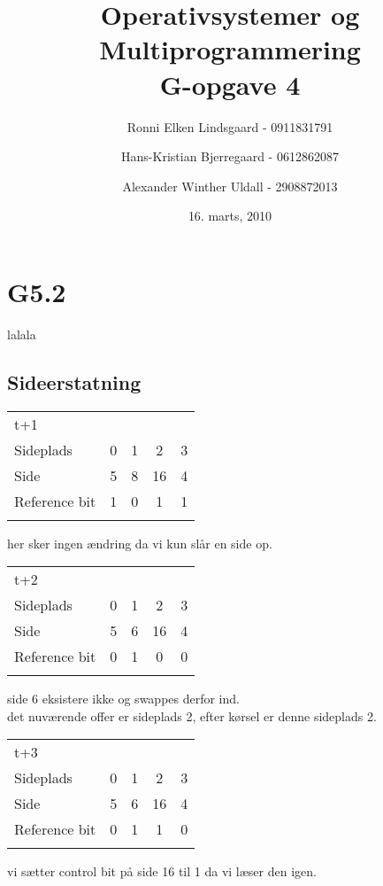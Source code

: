 \documentclass[titlepage]{article}
\title{Operativsystemer og Multiprogrammering\\G-opgave 4}
\author{Ronni Elken Lindsgaard - 0911831791 \and
Hans-Kristian Bjerregaard - 0612862087 \and
Alexander Winther Uldall - 2908872013}
\date{16. marts, 2010}
\begin{document}
\maketitle
\newpage

\section{G5.2}
lalala

 \subsection{Sideerstatning}


 \begin{tabular}{l | c | c | c | c}

t+1\\
Sideplads    & 0 & 1 & 2 & 3\\
Side         & 5 & 8 & 16 & 4\\
Reference bit & 1 & 0 & 1 & 1\\\\  
\end{tabular}

her sker ingen ændring da vi kun slår en side op.\\

\begin{tabular}{l | c | c | c | c}
t+2\\
Sideplads    & 0 & 1 & 2 & 3\\
Side         & 5 & 6 & 16 & 4\\
Reference bit & 0 & 1 & 0 & 0\\\\
\end{tabular}

side 6 eksistere ikke og swappes derfor ind.\\
det nuværende offer er sideplads 2, efter kørsel er denne sideplads 2.\\

\begin{tabular}{l | c | c | c | c}
t+3\\
Sideplads    & 0 & 1 & 2 & 3\\
Side         & 5 & 6 & 16 & 4\\
Reference bit & 0 & 1 & 1 & 0\\\\
\end{tabular}

vi sætter control bit på side 16 til 1 da vi læser den igen.\\
\end{document}

